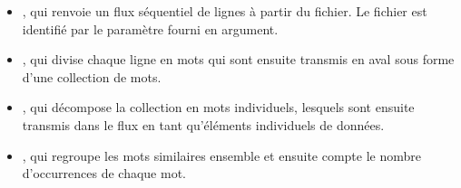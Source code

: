 \begin{itemize}
    \item {}, qui renvoie un flux s\'equentiel de lignes \`a partir du fichier. Le fichier est identifi\'e par le param\`etre  fourni en argument.

    \item {}, qui divise chaque ligne en mots qui sont ensuite transmis en aval sous forme d'une collection de mots.
    
    \item {}, qui décompose la collection en mots individuels, lesquels sont ensuite transmis dans le flux en tant qu'éléments individuels de données.
    
    \item {}, qui regroupe les mots similaires ensemble et ensuite compte le nombre d'occurrences de chaque mot.
    
\end{itemize}
